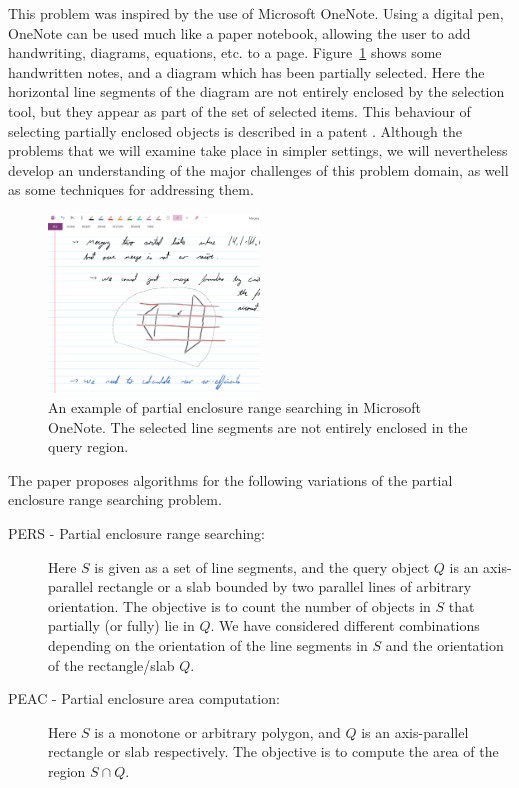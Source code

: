 \documentclass[a4paper,11pt]{article}
\newcommand{\PERS}[0]{PERS}
\newcommand{\PEAC}[0]{PEAC}
\begin{document}
This problem was inspired by the use of Microsoft 
OneNote. Using a digital pen, OneNote can be used much like a paper 
notebook, allowing the user to add handwriting, diagrams, equations, 
etc. to a page. 
Figure~\ref{fig:intro:onenote} shows some handwritten notes, and a 
diagram which has been partially selected. Here the horizontal 
line segments of the diagram are not entirely enclosed by 
the selection tool, but they appear as part of the set of selected 
items. This behaviour of selecting partially enclosed objects is 
described in a patent \cite{lassoselect}. 
Although the problems that we will 
examine take place in simpler settings, we will nevertheless develop 
an understanding of the major challenges of this problem domain, as 
well as some techniques for addressing them.


\begin{figure}[t]
\begin{center}
  \includegraphics[width=0.50\textwidth]{figures/fig_onenote}
  \caption{An example of partial enclosure range searching in 
  Microsoft OneNote. The selected line segments are not entirely 
  enclosed in the query region.}
  \label{fig:intro:onenote}
\end{center}
\end{figure}

The paper proposes algorithms for the following variations of 
the partial enclosure range searching problem.  
\begin{description}
\item[\PERS{} - Partial enclosure range searching:] Here $S$ 
is given as a set of line segments, and the query object $Q$ 
is an axis-parallel rectangle or a slab bounded by two parallel 
lines of arbitrary orientation. The objective is to count 
the number of objects in $S$ that partially (or fully) lie in $Q$. We have 
considered different combinations depending on the orientation 
of the line segments in $S$ and the orientation of the 
rectangle/slab $Q$.
\item[\PEAC{} - Partial enclosure area computation:] Here $S$ 
is a monotone or arbitrary polygon, and $Q$ is an axis-parallel 
rectangle or slab respectively. The objective is to compute the 
area of the region $S\cap Q$. 
\end{description}
\end{document}
